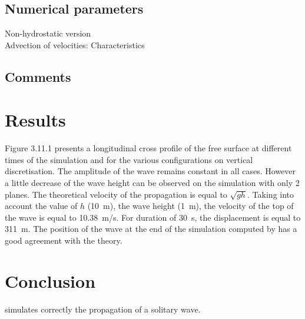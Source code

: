 \subsection{Numerical parameters}
%
Non-hydrostatic version\\
Advection of velocities: Characteristics
%
\subsection{Comments}
%
%
%
\section{Results}
%
Figure 3.11.1 presents a longitudinal cross profile of the free surface
at different times of the simulation and for the various configurations
on vertical discretisation.
The amplitude of the wave remains constant in all cases.
However a little decrease of the wave height can be observed on the
simulation with only 2 planes.
The theoretical velocity of the propagation is equal to $\sqrt{gh}$.
Taking into account the value of $h$ (10~m), the wave height (1~m),
the velocity of the top of the wave is equal to 10.38~m/s.
For duration of 30~s, the displacement is equal to 311~m.
The position of the wave at the end of the simulation computed by
 has a good agreement with the theory.
%
\section{Conclusion}
%
 simulates correctly the propagation of a solitary wave.
%
%

